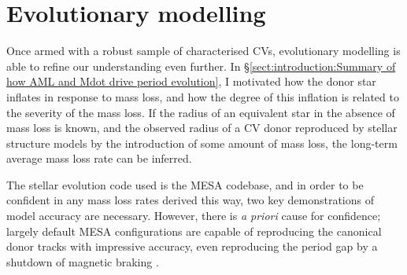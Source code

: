 \section{Evolutionary modelling}
\label{sect:modelling:evolutionary modelling}

Once armed with a robust sample of characterised CVs, evolutionary modelling is able to refine our understanding even further. In \S\ref{sect:introduction:Summary of how AML and Mdot drive period evolution}, I motivated how the donor star inflates in response to mass loss, and how the degree of this inflation is related to the severity of the mass loss.
If the radius of an equivalent star in the absence of mass loss is known, and the observed radius of a CV donor reproduced by stellar structure models by the introduction of some amount of mass loss, the long-term average mass loss rate can be inferred.

The stellar evolution code used is the MESA codebase, and in order to be confident in any mass loss rates derived this way, two key demonstrations of model accuracy are necessary. However, there is \textit{a priori} cause for confidence; largely default MESA configurations are capable of reproducing the canonical \citep{knigge11} donor tracks with impressive accuracy, even reproducing the period gap by a shutdown of magnetic braking \citep{Paxton_2015}.

